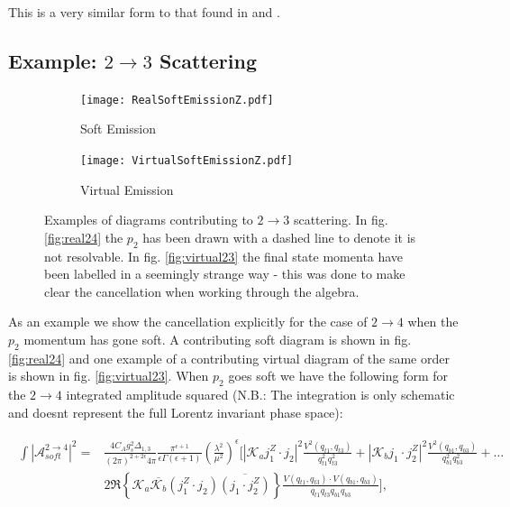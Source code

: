		This is a very similar form to that found in \cite{Constructing} and \cite{JeppeHiggs}.

	\subsection{Example: $2\rightarrow3$ Scattering}

		\begin{figure}[bth!]

			\centering

			\begin{subfigure}[b]{0.5\textwidth}
				\texttt{[image: RealSoftEmissionZ.pdf]}
				\caption{Soft Emission}
				\label{fig:real24}
			\end{subfigure}

			\begin{subfigure}[b]{0.5\textwidth}
				\centering
				\texttt{[image: VirtualSoftEmissionZ.pdf]}
				\caption{Virtual Emission}
				\label{fig:virtual23}
			\end{subfigure}

			\caption{Examples of diagrams contributing to $2\rightarrow3$ scattering.
			In fig. \eqref{fig:real24} the $p_2$ has been drawn with a dashed line to denote
			it is not resolvable.  In fig. \eqref{fig:virtual23} the final state momenta have
			been labelled in a seemingly strange way - this was done to make clear the
			cancellation when working through the algebra.}

			\label{fig:2to}
		\end{figure}

		As an example we show the cancellation explicitly for the case of $2\rightarrow4$ when the
		$p_2$ momentum has gone soft.  A contributing soft diagram is shown in fig. \eqref{fig:real24} and
		one example of a contributing virtual diagram of the same order is shown in fig. \eqref{fig:virtual23}.
		When $p_2$ goes soft we have the following form for the $2\rightarrow4$ integrated amplitude squared
		({N.B.}: The integration is only schematic and doesnt represent the full Lorentz invariant phase space):

		\begin{align}
		\begin{split}
			\int|\mathcal{A}^{2\rightarrow4}_{soft}|^2 = &\frac{4C_Ag_s^2\Delta_{1,3}}{(2\pi)^{2+2\epsilon}4\pi}
			\frac{\pi^{\epsilon+1}}{\epsilon\Gamma(\epsilon+1)}
			\left(\frac{\lambda^2}{\mu^2}\right)^\epsilon\Bigg[|\mathcal{K}_aj_1^Z\cdot j_2|^2
			\frac{V^2(q_{t1}, q_{t3})}{q^2_{t1}q^2_{t3}} + |\mathcal{K}_bj_1\cdot j_2^Z|^2
			\frac{V^2(q_{b1}, q_{b3})}{q^2_{b1}q^2_{b3}} + \ldots \\
			& 2\Re\left\{\mathcal{K}_a\overline{\mathcal{K}_b}
			(j_1^Z\cdot j_2)\overline{(j_1\cdot j_2^Z)}\right\} \frac{V(q_{t1}, q_{t3})
			\cdot V(q_{b1}, q_{b3})}{q_{t1}q_{t3}q_{b1}q_{b3}}\Bigg],
		\end{split}
		\end{align}

